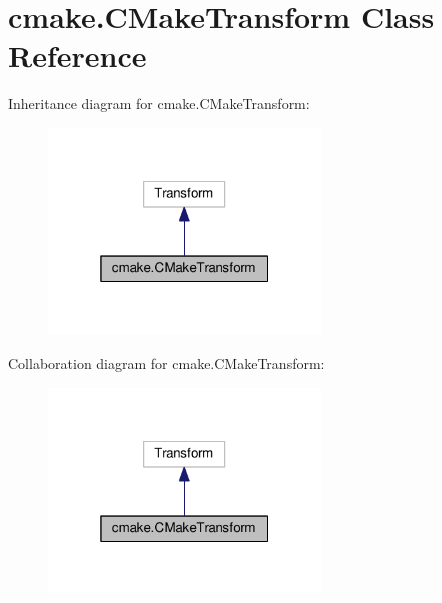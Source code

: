 \hypertarget{classcmake_1_1CMakeTransform}{}\section{cmake.\+C\+Make\+Transform Class Reference}
\label{classcmake_1_1CMakeTransform}


Inheritance diagram for cmake.\+C\+Make\+Transform\+:
\nopagebreak
\begin{figure}[H]
\begin{center}
\leavevmode
\includegraphics[width=205pt]{classcmake_1_1CMakeTransform__inherit__graph}
\end{center}
\end{figure}


Collaboration diagram for cmake.\+C\+Make\+Transform\+:
\nopagebreak
\begin{figure}[H]
\begin{center}
\leavevmode
\includegraphics[width=205pt]{classcmake_1_1CMakeTransform__coll__graph}
\end{center}
\end{figure}

